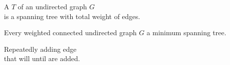 \begin{frame}{}
  \begin{definition}
    A  $T$ of an  undirected graph $G$ \\
    is a spanning tree with  total weight of edges.
  \end{definition}

  \pause
  \vspace{0.50cm}

  \pause
  \begin{center}
  \end{center}
\end{frame}

\begin{frame}{}
  \begin{theorem}
    Every weighted connected undirected graph $G$  a minimum spanning tree.
  \end{theorem}

  \pause
\end{frame}

\begin{frame}{}

  \begin{center}
  \end{center}
\end{frame}

\begin{frame}{}
  \begin{center}
    Repeatedly adding  edge \\[5pt]
    that will 
    until  are added.
  \end{center}

  \pause
\end{frame}

\begin{frame}{}

  \begin{center}
  \end{center}
\end{frame}

